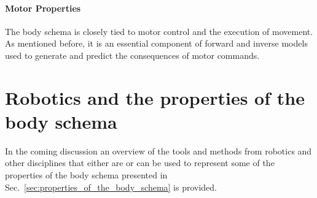 \paragraph*{Motor Properties} The body schema is closely tied to motor control and the execution of movement. As mentioned before, it is an essential component of forward and inverse models used to generate and predict the consequences of motor commands.




\section{Robotics and the properties of the body schema}
In the coming discussion an overview of the tools and methods from robotics and other disciplines that either are or can be used to represent some of the properties of the body schema presented in Sec.~\ref{sec:properties_of_the_body_schema} is provided. %

